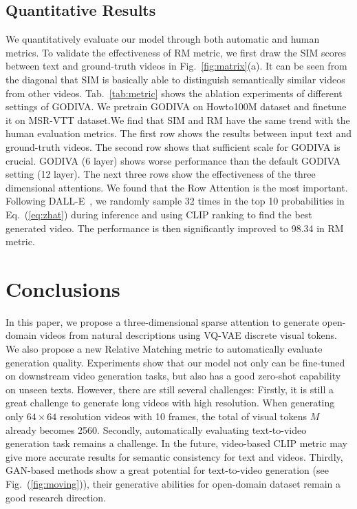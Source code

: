 \documentclass{article}
\begin{document}
\subsection{Quantitative Results}
We quantitatively evaluate our model through both automatic and human metrics. To validate the effectiveness of RM metric, we first draw the SIM scores between text and ground-truth videos in Fig.~\ref{fig:matrix}(a). It can be seen from the diagonal that SIM is basically able to distinguish semantically similar videos from other videos. Tab.~\ref{tab:metric} shows the ablation experiments of different settings of GODIVA. We pretrain GODIVA on Howto100M dataset and finetune it on MSR-VTT dataset.We find that SIM and RM have the same trend with the human evaluation metrics. The first row shows the results between input text and ground-truth videos. The second row shows that sufficient scale for GODIVA is crucial. GODIVA (6 layer) shows worse performance than the default GODIVA setting (12 layer). The next three rows show the effectiveness of the three dimensional attentions. We found that the Row Attention is the most important. Following DALL-E~\cite{rameshZeroShotTexttoImageGeneration2021}, we randomly sample 32 times in the top 10 probabilities in Eq.~(\ref{eq:zhat}) during inference and using CLIP ranking to find the best generated video. The performance is then significantly improved to 98.34 in RM metric. 


\section{Conclusions}
In this paper, we propose a three-dimensional sparse attention to generate open-domain videos from natural descriptions using VQ-VAE discrete visual tokens. We also propose a new Relative Matching metric to automatically evaluate generation quality. Experiments show that our model not only can be fine-tuned on downstream video generation tasks, but also has a good zero-shot capability on unseen texts. However, there are still several challenges:
Firstly, it is still a great challenge to generate long videos with high resolution. When generating only $64\times 64$ resolution videos with 10 frames, the total of visual tokens $M$ already becomes 2560. Secondly, automatically evaluating text-to-video generation task remains a challenge. In the future, video-based CLIP metric may give more accurate results for semantic consistency for text and videos. Thirdly, GAN-based methods show a great potential for text-to-video generation (see Fig.~(\ref{fig:moving})), their generative abilities for open-domain dataset remain a good research direction.


\end{document}
